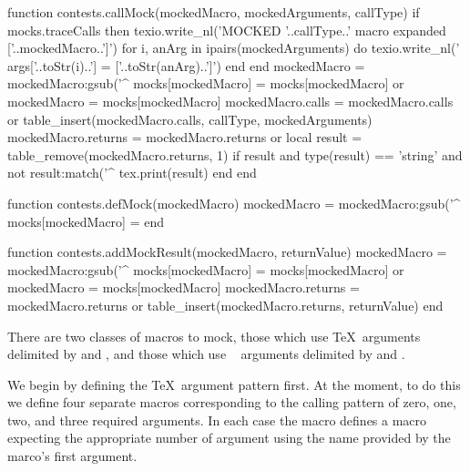 function contests.callMock(mockedMacro, mockedArguments, callType)
  if mocks.traceCalls then
    texio.write_nl('MOCKED '..callType..' macro expanded ['..mockedMacro..']')
    for i, anArg in ipairs(mockedArguments) do
      texio.write_nl('  args['..toStr(i)..'] = ['..toStr(anArg)..']')
    end
  end
  mockedMacro = mockedMacro:gsub('^%
  mocks[mockedMacro] = mocks[mockedMacro] or { }
  mockedMacro = mocks[mockedMacro]
  mockedMacro.calls = mockedMacro.calls or { }
  table_insert(mockedMacro.calls, { callType, mockedArguments})
  mockedMacro.returns = mockedMacro.returns or { }
  local result = table_remove(mockedMacro.returns, 1)
  if result and type(result) == 'string' and not result:match('^%
    tex.print(result)
  end
end

function contests.defMock(mockedMacro)
  mockedMacro = mockedMacro:gsub('^%
  mocks[mockedMacro] = { }
end

function contests.addMockResult(mockedMacro, returnValue)
  mockedMacro = mockedMacro:gsub('^%
  mocks[mockedMacro] = mocks[mockedMacro] or { }
  mockedMacro = mocks[mockedMacro]
  mockedMacro.returns = mockedMacro.returns or { }
  table_insert(mockedMacro.returns, returnValue)
end
\stopLuaCode


There are two classes of macros to mock, those which use  
\TeX\ arguments delimited by \quote{\{} and \quote{\}}, and those which 
use \ConTeXt\  arguments delimited by \quote{\[} and 
\quote{\]}. 

We begin by defining the \TeX\ argument pattern first. At the moment, to 
do this we define four separate macros corresponding to the calling 
pattern of zero, one, two, and three required arguments. In each case the 
 macro defines a macro expecting the appropriate 
number of argument using the name provided by the  
marco's first argument. 

\startMkIVCode
\def\callTexMockZero#1{%
  \directlua{%
    thirddata.contests.callMock('#1', { }, 'tex')
  }
}
\def\defTexMockZeroArgs#1{%
  \directlua{thirddata.contests.defMock('#1')}%
  \setevalue{#1}{\noexpand\callTexMockZero{#1}}%
}

\def\callTexMockOne#1#2{%
  \directlua{%
    thirddata.contests.callMock('#1', { '#2' }, 'tex')
  }
}
\def\defTexMockOneArg#1{%
  \directlua{thirddata.contests.defMock('#1')}%
  \setevalue{#1}{\noexpand\callTexMockOne{#1}}%
}

